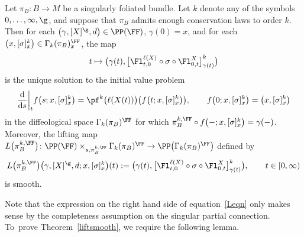 \begin{Theorem}\label{liftsmooth}
Let $\pi_{B}\colon B\rightarrow M$ be a singularly foliated bundle. Let $k$ denote any of the symbols $0,\dots,\infty,\g$, and suppose that $\pi_{B}$ admits enough conservation laws to order $k$. Then for each $\big(\gamma,[X]^{\g},d\big)\in\PP(\FF)$, $\gamma(0) = x$, and for each $\big(x,[\sigma]^{k}_{x}\big)\in\Gamma_{k}(\pi_{B})^{\FF}_{x}$, the map
\begin{gather}\label{ivpsol}
t\mapsto\big(\gamma(t),\big[\Fl^{\ell(X)}_{t,0}\circ\sigma\circ\Fl^{X}_{0,t}\big]^{k}_{\gamma(t)}\big)
\end{gather}
is the unique solution to the initial value problem
\begin{gather}\label{ivp}
\frac{\rm d}{{\rm d}s}\bigg|_{t}f\big(s;x,[\sigma]^{k}_{x}\big) = \pf^{k}\big(\ell(X(t))\big)\big(f\big(t;x,[\sigma]^{k}_{x}\big)\big),\qquad
f\big(0;x,[\sigma]^{k}_{x}\big) = \big(x,[\sigma]^{k}_{x}\big)
\end{gather}
in the diffeological space $\Gamma_{k}(\pi_{B})^{\FF}$ for which $\pi_{B}^{k,\FF}\circ f\big({-};x,[\sigma]^{k}_{x}\big) = \gamma(-)$. Moreover, the lifting map $L\big(\pi_{B}^{k,\FF}\big)\colon \PP(\FF)\times_{s,\pi_{B}^{k,\FF}}\Gamma_{k}(\pi_{B})^{\FF}\rightarrow \PP\big(\Gamma_{k}(\pi_{B})^{\FF}\big)$ defined by
\begin{gather}\label{Leqn}
L\big(\pi_{B}^{k,\FF}\big)\big(\gamma,[X]^{\g},d;x,[\sigma]^{k}_{x}\big)(t):=
\big(\gamma(t),\big[\Fl^{\ell(X)}_{t,0}\circ\sigma\circ\Fl^{X}_{0,t}\big]^{k}_{\gamma(t)}\big),\qquad t\in[0,\infty)
\end{gather}
is smooth.
\end{Theorem}

Note that the expression on the right hand side of equation~\eqref{Leqn} only makes sense by the completeness assumption on the singular partial connection. To~prove Theorem~\ref{liftsmooth}, we require the following lemma.

